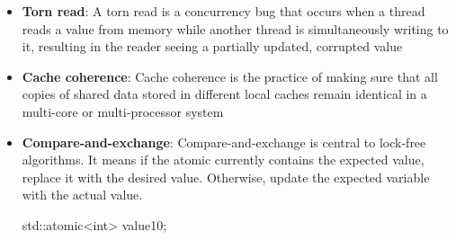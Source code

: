 \documentclass{report}
\begin{document}
\begin{itemize}
\begin{cppcode}
                while (!cached) {
                }
            \end{cppcode}
            \bigbreak \noindent 
            The worker might therefore loop forever even after the main thread assigns true.
            \bigbreak \noindent 
            Each CPU core has registers, caches, and store buffers. A normal write does not provide the synchronization required by the C++ memory model to make another thread observe the change correctly.
            \bigbreak \noindent 
            Modern hardware has cache-coherence mechanisms, but those mechanisms alone do not make racy C++ code valid. The compiler and processor are both allowed to reorder ordinary operations when no synchronization is present.
            \bigbreak \noindent 
            On many systems, reading or writing a single byte-sized bool happens as one hardware operation. That only means the reader probably will not observe a partially written value.
            \bigbreak \noindent 
            Thread safety requires more than preventing a torn read. It also requires:
            \bigbreak \noindent 
            \begin{itemize}
                \item Defined concurrent access
                \item Appropriate visibility between threads
                \item Restrictions on compiler and processor reordering
            \end{itemize}
            A normal bool provides none of these guarantees.
        \item \textbf{Torn read}: A torn read is a concurrency bug that occurs when a thread reads a value from memory while another thread is simultaneously writing to it, resulting in the reader seeing a partially updated, corrupted value
        \item \textbf{Cache coherence}: Cache coherence is the practice of making sure that all copies of shared data stored in different local caches remain identical in a multi-core or multi-processor system
        \item \textbf{Compare-and-exchange}: Compare-and-exchange is central to lock-free algorithms. It means if the atomic currently contains the expected value, replace it with the desired value. Otherwise, update the expected variable with the actual value.
            \bigbreak \noindent 
            \begin{cppcode}
                std::atomic<int> value{10};


\end{cppcode}
\end{itemize}
\end{document}
